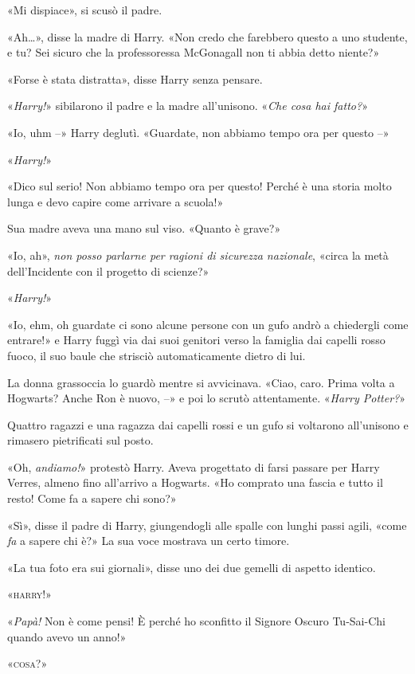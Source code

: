 «Mi dispiace», si scusò il padre.

«Ah…», disse la madre di Harry. «Non credo che farebbero questo a uno studente, e tu? Sei sicuro che la professoressa McGonagall non ti abbia detto niente?»

«Forse è stata distratta», disse Harry senza pensare.

«\textit{Harry!}» sibilarono il padre e la madre all’unisono. «\textit{Che cosa hai fatto?}»

«Io, uhm –» Harry deglutì. «Guardate, non abbiamo tempo ora per questo –»

«\textit{Harry!}»

«Dico sul serio! Non abbiamo tempo ora per questo! Perché è una storia molto lunga e devo capire come arrivare a scuola!»

Sua madre aveva una mano sul viso. «Quanto è grave?»

«Io, ah», \textit{non posso parlarne per ragioni di sicurezza nazionale}, «circa la metà dell’Incidente con il progetto di scienze?»

«\textit{Harry!}»

«Io, ehm, oh guardate ci sono alcune persone con un gufo andrò a chiedergli come entrare!» e Harry fuggì via dai suoi genitori verso la famiglia dai capelli rosso fuoco, il suo baule che strisciò automaticamente dietro di lui.

La donna grassoccia lo guardò mentre si avvicinava. «Ciao, caro. Prima volta a Hogwarts? Anche Ron è nuovo, –» e poi lo scrutò attentamente. «\textit{Harry Potter?}»

Quattro ragazzi e una ragazza dai capelli rossi e un gufo si voltarono all’unisono e rimasero pietrificati sul posto.

«Oh, \textit{andiamo!}» protestò Harry. Aveva progettato di farsi passare per Harry Verres, almeno fino all’arrivo a Hogwarts. «Ho comprato una fascia e tutto il resto! Come fa a sapere chi sono?»

«Sì», disse il padre di Harry, giungendogli alle spalle con lunghi passi agili, «come \textit{fa} a sapere chi è?» La sua voce mostrava un certo timore.

«La tua foto era sui giornali», disse uno dei due gemelli di aspetto identico.

«\textsc{harry!}»

«\textit{Papà!} Non è come pensi! È perché ho sconfitto il Signore Oscuro Tu-Sai-Chi quando avevo un anno!»

«\textsc{cosa?}»


